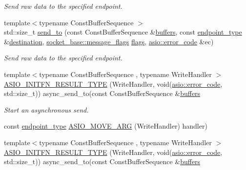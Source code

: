 \begin{DoxyCompactItemize}
\begin{DoxyCompactList}\small\item\em Send raw data to the specified endpoint. \end{DoxyCompactList}\item 
{\footnotesize template$<$typename Const\+Buffer\+Sequence $>$ }\\std\+::size\+\_\+t \hyperlink{classasio_1_1basic__raw__socket_ad3a53d5bc62106433b40283603a53484}{send\+\_\+to} (const Const\+Buffer\+Sequence \&\hyperlink{group__async__read_ga54dede45c3175148a77fe6635222c47d}{buffers}, const \hyperlink{classasio_1_1basic__raw__socket_a75803815223ab2cbfa66c51a650236b5}{endpoint\+\_\+type} \&\hyperlink{classasio_1_1basic__raw__socket_ad4085e3f776b88e9f818fd8f34295ecb}{destination}, \hyperlink{classasio_1_1socket__base_ac3cf77465dfedfe1979b5415cf32cc94}{socket\+\_\+base\+::message\+\_\+flags} \hyperlink{classasio_1_1basic__raw__socket_a324289af06e6526b244c1074db009c3f}{flags}, \hyperlink{classasio_1_1error__code}{asio\+::error\+\_\+code} \&ec)
\begin{DoxyCompactList}\small\item\em Send raw data to the specified endpoint. \end{DoxyCompactList}\item 
{\footnotesize template$<$typename Const\+Buffer\+Sequence , typename Write\+Handler $>$ }\\\hyperlink{classasio_1_1basic__raw__socket_ab36eaf48d0476bf5719865ac302979b8}{A\+S\+I\+O\+\_\+\+I\+N\+I\+T\+F\+N\+\_\+\+R\+E\+S\+U\+L\+T\+\_\+\+T\+Y\+P\+E} (Write\+Handler, void(\hyperlink{classasio_1_1error__code}{asio\+::error\+\_\+code}, std\+::size\+\_\+t)) async\+\_\+send\+\_\+to(const Const\+Buffer\+Sequence \&\hyperlink{group__async__read_ga54dede45c3175148a77fe6635222c47d}{buffers}
\begin{DoxyCompactList}\small\item\em Start an asynchronous send. \end{DoxyCompactList}\item 
const \hyperlink{classasio_1_1basic__raw__socket_a75803815223ab2cbfa66c51a650236b5}{endpoint\+\_\+type} \hyperlink{classasio_1_1basic__raw__socket_adf576b3a89d29d8d12a92289cd8d1acf}{A\+S\+I\+O\+\_\+\+M\+O\+V\+E\+\_\+\+A\+R\+G} (Write\+Handler) handler)
\item 
{\footnotesize template$<$typename Const\+Buffer\+Sequence , typename Write\+Handler $>$ }\\\hyperlink{classasio_1_1basic__raw__socket_ab36eaf48d0476bf5719865ac302979b8}{A\+S\+I\+O\+\_\+\+I\+N\+I\+T\+F\+N\+\_\+\+R\+E\+S\+U\+L\+T\+\_\+\+T\+Y\+P\+E} (Write\+Handler, void(\hyperlink{classasio_1_1error__code}{asio\+::error\+\_\+code}, std\+::size\+\_\+t)) async\+\_\+send\+\_\+to(const Const\+Buffer\+Sequence \&\hyperlink{group__async__read_ga54dede45c3175148a77fe6635222c47d}{buffers}

\end{DoxyCompactItemize}
